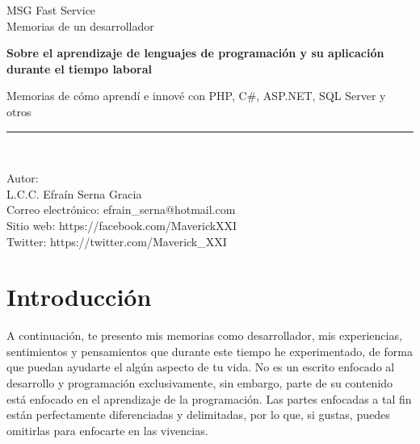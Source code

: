\documentclass[12pt,spanish,lettersize]{book}
\begin{document}
\begin{titlepage}
\begin{center}
MSG Fast Service\\
\vspace*{0.15in}
Memorias de un desarrollador \\
\vspace*{0.6in}
\vspace*{0.2in}
\begin{Large}
\textbf{Sobre el aprendizaje de lenguajes de programaci\'on y su aplicaci\'on durante el tiempo laboral} \\
\end{Large}
\vspace*{0.3in}
\begin{large}
Memorias de c\'omo aprend\'i e innov\'e con PHP, C\#, ASP.NET, SQL Server y otros\\
\end{large}
\vspace*{0.3in}
\rule{80mm}{0.1mm}\\
\vspace*{0.1in}
\begin{large}
Autor: \\
L.C.C. Efra\'in Serna Gracia \\
\vspace*{0.3in}
Correo electr\'onico: efrain\_serna@hotmail.com\\

Sitio web: https://facebook.com/MaverickXXI\\

Twitter: https://twitter.com/Maverick\_XXI
\end{large}
\end{center}
\end{titlepage}
\tableofcontents

\chapter{Introducción}
A continuación, te presento mis memorias como desarrollador, mis experiencias, sentimientos y pensamientos que durante este tiempo he experimentado, de forma que puedan ayudarte el algún aspecto de tu vida. No es un escrito enfocado al desarrollo y programación exclusivamente, sin embargo, parte de su contenido está enfocado en el aprendizaje de la programación. Las partes enfocadas a tal fin están perfectamente diferenciadas y delimitadas, por lo que, si gustas, puedes omitirlas para enfocarte en las vivencias.\\
\end{document}
